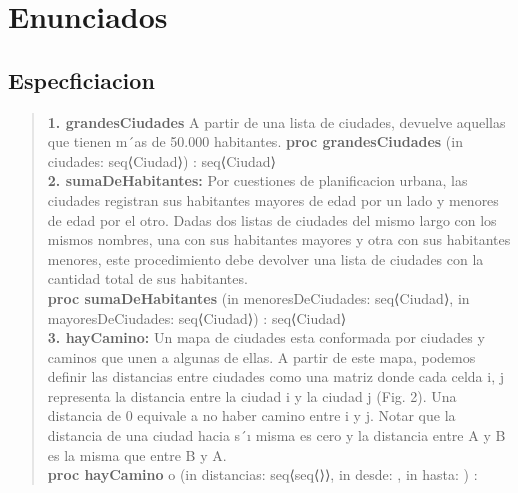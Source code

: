 \documentclass[10pt,a4paper]{article}
\begin{document}
\maketitle
\section {Enunciados}
\subsection{Especficiacion}

\begin{quote}
\vspace{0.2cm}
\textbf{1. grandesCiudades} A partir de una lista de ciudades, devuelve aquellas que tienen m´as de 50.000 habitantes.
\textbf {proc  grandesCiudades} (in ciudades: seq⟨Ciudad⟩) : seq⟨Ciudad⟩
\vspace{0.2cm}
\\
\vspace{0.2cm}
\textbf{2. sumaDeHabitantes:} Por cuestiones de planificacion urbana, las ciudades registran sus habitantes mayores de edad
por un lado y menores de edad por el otro. Dadas dos listas de ciudades del mismo largo con los mismos nombres, una
con sus habitantes mayores y otra con sus habitantes menores, este procedimiento debe devolver una lista de ciudades
con la cantidad total de sus habitantes.
\\
\vspace{0.2cm}
\textbf {proc sumaDeHabitantes} (in menoresDeCiudades: seq⟨Ciudad⟩, in mayoresDeCiudades: seq⟨Ciudad⟩) : seq⟨Ciudad⟩
\\
\vspace{0.2cm}
\textbf{3. hayCamino:} Un mapa de ciudades esta conformada por ciudades y caminos que unen a algunas de ellas. A partir de
este mapa, podemos definir las distancias entre ciudades como una matriz donde cada celda i, j representa la distancia
entre la ciudad i y la ciudad j (Fig. 2). Una distancia de 0 equivale a no haber camino entre i y j. Notar que la distancia
de una ciudad hacia s´ı misma es cero y la distancia entre A y B es la misma que entre B y A.
\vspace{0.2cm}
\\ 
\vspace{0.2cm}
\textbf{proc hayCamino} o (in distancias: seq⟨seq⟨\ent⟩⟩, in desde: \ent, in hasta: \ent) : \bool
\vspace{0.2cm}
\\
\vspace{0.2cm}

\end{quote}
\end{document}
